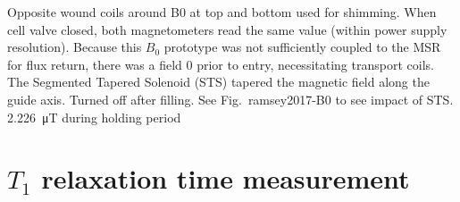 Opposite wound coils around B0 at top and bottom used for shimming. When cell valve closed, both magnetometers read the same value (within power supply resolution). Because this $B_0$ prototype was not sufficiently coupled to the MSR for flux return, there was a field 0 prior to entry, necessitating transport coils. The Segmented Tapered Solenoid (STS) tapered the magnetic field along the guide axis. Turned off after filling. See Fig.~ramsey2017-B0 to see impact of STS. \qty{2.226}{\micro T} during holding period



\section
{
    \texorpdfstring{$T_1$ relaxation time measurement}
                    {T1 relaxation time measurement}
}



